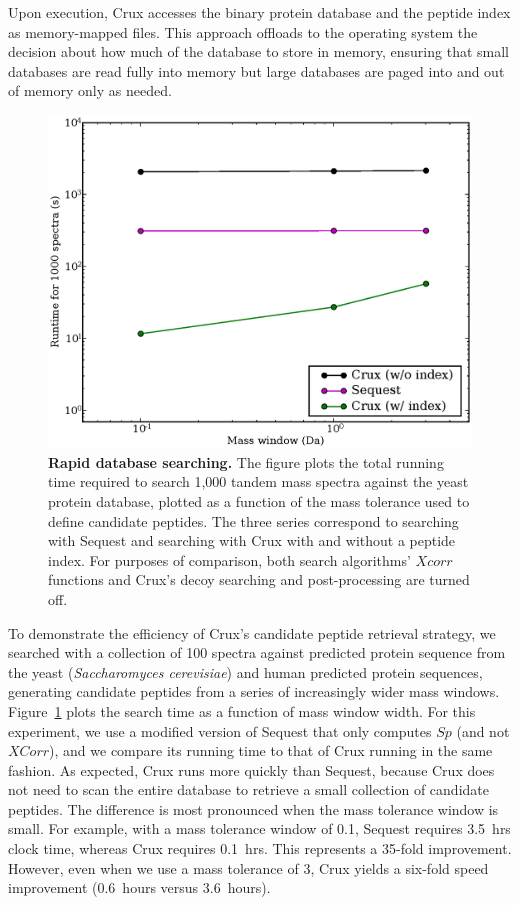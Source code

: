 \documentclass[12pt]{article}
\begin{document}
Upon execution, Crux accesses the binary protein database and the
peptide index as memory-mapped files.  This approach offloads to the
operating system the decision about how much of the database to store
in memory, ensuring that small databases are read fully into memory
but large databases are paged into and out of memory only as needed.

\begin{figure}
  \centering
  \includegraphics[width=5in]{./Images/indexing.eps}
  \caption{{\bf Rapid database searching.}  The figure plots the total
  running time required to search 1,000 tandem mass spectra against
  the yeast protein database, plotted as a function of the mass
  tolerance used to define candidate peptides.  The three series
  correspond to searching with {\sc Sequest} and searching with Crux
  with and without a peptide index.  For purposes of comparison,
  both search algorithms' $Xcorr$ functions 
  and Crux's decoy searching and post-processing are turned off.
  \label{figure:indexing}}
\end{figure}

To demonstrate the efficiency of Crux's candidate peptide retrieval
strategy, we searched with a collection of 100 spectra against predicted 
protein sequence from the yeast ({\em Saccharomyces cerevisiae}) and 
human predicted protein sequences, 
generating candidate peptides from a series of increasingly wider
mass windows.  Figure~\ref{figure:indexing} plots the search time as a
function of mass window width.  For this experiment, we use a modified
version of {\sc Sequest} that only computes $Sp$ (and not $XCorr$), and we
compare its running time to that of Crux running in the same fashion.
As expected, Crux runs more quickly than {\sc Sequest}, because Crux does
not need to scan the entire database to retrieve a small collection of
candidate peptides.  The difference is most pronounced when the mass
tolerance window is small.  For example, with a mass tolerance window
of 0.1, {\sc Sequest} requires 3.5~hrs clock time, whereas Crux requires
0.1~hrs.  This represents a 35-fold improvement.  However, even when
we use a mass tolerance of 3, Crux yields a six-fold speed improvement
(0.6~hours versus 3.6~hours).  %
\end{document}
